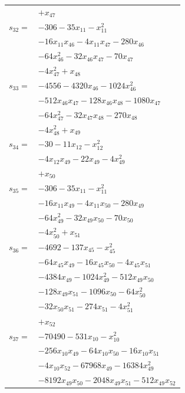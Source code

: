 \begin{longtable}{@{}r@{\;}l@{}}
 & \(\displaystyle +x_{47}\) \\[3pt]
\(s_{32}=\) & \(\displaystyle -306 -35x_{11} -x_{11}^{2}\) \\
 & \(\displaystyle -16x_{11}x_{46} -4x_{11}x_{47} -280x_{46}\) \\
 & \(\displaystyle -64x_{46}^{2} -32x_{46}x_{47} -70x_{47}\) \\
 & \(\displaystyle -4x_{47}^{2} +x_{48}\) \\[3pt]
\(s_{33}=\) & \(\displaystyle -4556 -4320x_{46} -1024x_{46}^{2}\) \\
 & \(\displaystyle -512x_{46}x_{47} -128x_{46}x_{48} -1080x_{47}\) \\
 & \(\displaystyle -64x_{47}^{2} -32x_{47}x_{48} -270x_{48}\) \\
 & \(\displaystyle -4x_{48}^{2} +x_{49}\) \\[3pt]
\(s_{34}=\) & \(\displaystyle -30 -11x_{12} -x_{12}^{2}\) \\
 & \(\displaystyle -4x_{12}x_{49} -22x_{49} -4x_{49}^{2}\) \\
 & \(\displaystyle +x_{50}\) \\[3pt]
\(s_{35}=\) & \(\displaystyle -306 -35x_{11} -x_{11}^{2}\) \\
 & \(\displaystyle -16x_{11}x_{49} -4x_{11}x_{50} -280x_{49}\) \\
 & \(\displaystyle -64x_{49}^{2} -32x_{49}x_{50} -70x_{50}\) \\
 & \(\displaystyle -4x_{50}^{2} +x_{51}\) \\[3pt]
\(s_{36}=\) & \(\displaystyle -4692 -137x_{45} -x_{45}^{2}\) \\
 & \(\displaystyle -64x_{45}x_{49} -16x_{45}x_{50} -4x_{45}x_{51}\) \\
 & \(\displaystyle -4384x_{49} -1024x_{49}^{2} -512x_{49}x_{50}\) \\
 & \(\displaystyle -128x_{49}x_{51} -1096x_{50} -64x_{50}^{2}\) \\
 & \(\displaystyle -32x_{50}x_{51} -274x_{51} -4x_{51}^{2}\) \\
 & \(\displaystyle +x_{52}\) \\[3pt]
\(s_{37}=\) & \(\displaystyle -70490 -531x_{10} -x_{10}^{2}\) \\
 & \(\displaystyle -256x_{10}x_{49} -64x_{10}x_{50} -16x_{10}x_{51}\) \\
 & \(\displaystyle -4x_{10}x_{52} -67968x_{49} -16384x_{49}^{2}\) \\
 & \(\displaystyle -8192x_{49}x_{50} -2048x_{49}x_{51} -512x_{49}x_{52}\) \\

\end{longtable}
